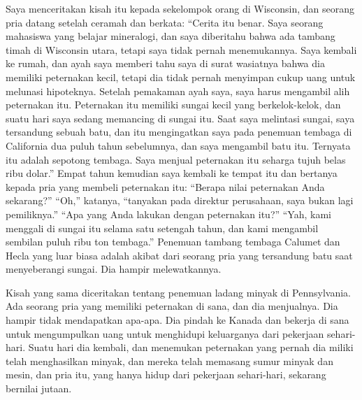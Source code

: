 \documentclass[
  letterpaper,
  DIV=11,
  numbers=noendperiod]{scrreprt}
\begin{document}
Saya menceritakan kisah itu kepada sekelompok orang di Wisconsin, dan
seorang pria datang setelah ceramah dan berkata: ``Cerita itu benar.
Saya seorang mahasiswa yang belajar mineralogi, dan saya diberitahu
bahwa ada tambang timah di Wisconsin utara, tetapi saya tidak pernah
menemukannya. Saya kembali ke rumah, dan ayah saya memberi tahu saya di
surat wasiatnya bahwa dia memiliki peternakan kecil, tetapi dia tidak
pernah menyimpan cukup uang untuk melunasi hipoteknya. Setelah pemakaman
ayah saya, saya harus mengambil alih peternakan itu. Peternakan itu
memiliki sungai kecil yang berkelok-kelok, dan suatu hari saya sedang
memancing di sungai itu. Saat saya melintasi sungai, saya tersandung
sebuah batu, dan itu mengingatkan saya pada penemuan tembaga di
California dua puluh tahun sebelumnya, dan saya mengambil batu itu.
Ternyata itu adalah sepotong tembaga. Saya menjual peternakan itu
seharga tujuh belas ribu dolar.'' Empat tahun kemudian saya kembali ke
tempat itu dan bertanya kepada pria yang membeli peternakan itu:
``Berapa nilai peternakan Anda sekarang?'' ``Oh,'' katanya, ``tanyakan
pada direktur perusahaan, saya bukan lagi pemiliknya.'' ``Apa yang Anda
lakukan dengan peternakan itu?'' ``Yah, kami menggali di sungai itu
selama satu setengah tahun, dan kami mengambil sembilan puluh ribu ton
tembaga.'' Penemuan tambang tembaga Calumet dan Hecla yang luar biasa
adalah akibat dari seorang pria yang tersandung batu saat menyeberangi
sungai. Dia hampir melewatkannya.

Kisah yang sama diceritakan tentang penemuan ladang minyak di
Pennsylvania. Ada seorang pria yang memiliki peternakan di sana, dan dia
menjualnya. Dia hampir tidak mendapatkan apa-apa. Dia pindah ke Kanada
dan bekerja di sana untuk mengumpulkan uang untuk menghidupi keluarganya
dari pekerjaan sehari-hari. Suatu hari dia kembali, dan menemukan
peternakan yang pernah dia miliki telah menghasilkan minyak, dan mereka
telah memasang sumur minyak dan mesin, dan pria itu, yang hanya hidup
dari pekerjaan sehari-hari, sekarang bernilai jutaan.
\end{document}
